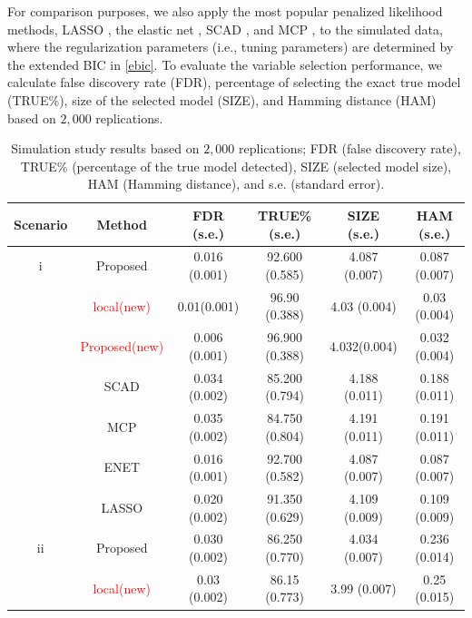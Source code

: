 \documentclass[12pt]{article}
\begin{document}
For comparison purposes, we also apply the most popular penalized likelihood methods, LASSO \citep{tibshirani1996regression}, the elastic net \citep{zou2005regularization}, SCAD \citep{fan2001variable}, and MCP \citep{zhang2010nearly}, to the simulated data, where the regularization parameters (i.e., tuning parameters) are determined by the extended BIC in \eqref{ebic}. To evaluate the variable selection performance, we calculate false discovery rate (FDR), percentage of selecting the exact true model (TRUE\%), size of the selected model (SIZE), and Hamming distance (HAM) based on $2,000$ replications.


\begin{table}[H]
 \centering
 \caption{Simulation study results based on $2,000$ replications; FDR (false discovery rate), TRUE\% (percentage of the true model detected), SIZE (selected model size), HAM (Hamming distance), and s.e. (standard error).}\label{T:sim1}
 \begin{tabular}{cc|c|c|c|c}
  \hline
  Scenario & Method                         & FDR  (s.e.)    & TRUE\% (s.e.)   & SIZE (s.e.)     & HAM (s.e.)    \\
  \hline
  i        & Proposed                       & 0.016 (0.001)  & 92.600 (0.585)  & 4.087 (0.007)   & 0.087 (0.007) \\
           & \textcolor{red}{local(new)}    & 0.01(0.001)    & 96.90 (0.388)   & 4.03  (0.004)   & 0.03 (0.004)  \\
           & \textcolor{red}{Proposed(new)} & 0.006 (0.001)  & 96.900 (0.388)  & 4.032(0.004)    & 0.032 (0.004) \\
           & SCAD                           & 0.034 (0.002)  & 85.200 (0.794)  & 4.188 (0.011)   & 0.188 (0.011) \\
           & MCP                            & 0.035 (0.002)  & 84.750 (0.804)  & 4.191 (0.011)   & 0.191 (0.011) \\
           & ENET                           & 0.016 (0.001)  & 92.700 (0.582)  & 4.087 (0.007)   & 0.087 (0.007) \\
           & LASSO                          & 0.020 (0.002)  & 91.350 (0.629)  & 4.109 (0.009)   & 0.109 (0.009) \\
  \hline
  ii       & Proposed                       & 0.030 (0.002)  & 86.250 (0.770)  & 4.034 (0.007)   & 0.236 (0.014) \\
           & \textcolor{red}{local(new)}    & 0.03  (0.002)  & 86.15  (0.773)  & 3.99 (0.007)    & 0.25  (0.015) \\

\end{tabular}
\end{table}
\end{document}
